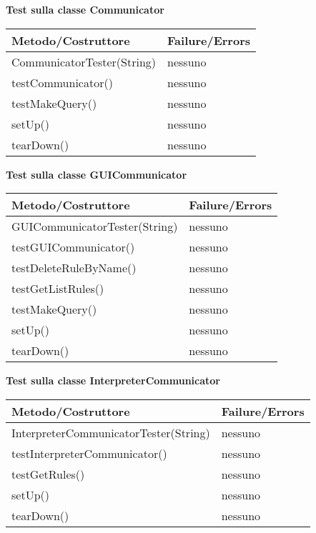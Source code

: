 \textbf{Test sulla classe Communicator}\\
\begin{center}
\begin{tabular}{|p{}|p{3 cm}|} \hline
\textbf{Metodo/Costruttore} & \textbf{Failure/Errors} \\ \hline
CommunicatorTester(String) & nessuno \\ \hline
testCommunicator() & nessuno \\ \hline
testMakeQuery() & nessuno \\ \hline
setUp() & nessuno \\ \hline
tearDown() & nessuno \\ \hline
\end{tabular}
\end{center}


\textbf{Test sulla classe GUICommunicator}\\
\begin{center}
\begin{tabular}{|p{}|p{3 cm}|} \hline
\textbf{Metodo/Costruttore} & \textbf{Failure/Errors} \\ \hline
GUICommunicatorTester(String) & nessuno \\ \hline
testGUICommunicator() & nessuno \\ \hline
testDeleteRuleByName() & nessuno \\ \hline
testGetListRules() & nessuno \\ \hline
testMakeQuery() & nessuno \\ \hline
setUp() & nessuno \\ \hline
tearDown() & nessuno \\ \hline
\end{tabular}
\end{center}

\textbf{Test sulla classe InterpreterCommunicator}\\
\begin{center}
\begin{tabular}{|p{}|p{3 cm}|} \hline
\textbf{Metodo/Costruttore} & \textbf{Failure/Errors} \\ \hline
InterpreterCommunicatorTester(String) & nessuno \\ \hline
testInterpreterCommunicator() & nessuno \\ \hline
testGetRules() & nessuno \\ \hline
setUp() & nessuno \\ \hline
tearDown() & nessuno \\ \hline
\end{tabular}
\end{center}

